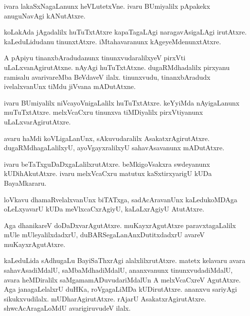 \documentclass{article}
\begin{document}
\begin{mng}%
ivara lakaSxNagaLanunx heVLutetxVne. ivaru BUmiyalilx pApakekx anuguNavAgi kANutAtxre.
\end{mng}

\begin{mng}%
koLakAda jAgadalilx huTuTxtAtxre kapaTagaLAgi naragavAsigaLAgi irutAtxre. kaLeduLidudanu 
tinunxtAtxre. iMtahavaranunx kAgeyeMdenunxtAtxre.
\end{mng}

\begin{mng}%
A pApiyu tinanxbAradudanunx tinunxvudaralilxyeV pirxVti uLaLxvanAgirutAtxne. nAyAgi huTuTxtAtxne. 
dugaRMdhadalilx pirxyanu ramisalu avarivareMba BeVdaveV ilalx. tinunxvudu, tinanxbAradudx 
ivelalxvanUnx tiMdu jiVvana mADutAtxne.
\end{mng}

\begin{mng}%
ivaru BUmiyalilx niVcayoVnigaLalilx huTuTxtAtxre. keYyiMda nAyigaLanunx muTuTxtAtxre. melxVcaCxru 
tinunxva tiMDiyalilx pirxVtiyanunx uLaLxvarAgirutAtxre.
\end{mng}

\begin{mng}%
avaru haMdi koVLigaLanUnx, sAkuvudaralilx AsakatxrAgirutAtxre. dugaRMdhagaLalilxyU, 
ayoVgayxralilxyU sahavAsavanunx mADutAtxre.
\end{mng}

\begin{mng}%
ivaru beTaTxguDaDxgaLalilxrutAtxre. beMkigoVsakxra swdeyanunx kUDihAkutAtxre. ivaru melxVcaCxru 
matutux kaSxtirxyarigU kUDa BayaMkararu.
\end{mng}

\begin{mng}%
loVkavu dhamaRvelalxvanUnx biTATxga, sadAcAravanUnx kaLedukoMDAga oLeLxyavarU kUDa 
meVlxcaCxrAgiyU, kaLaLxrAgiyU AtutAtxre.
\end{mng}

\begin{mng}%
Aga dhanikareV doDaDxvarAgutAtxre. muKayxrAgutAtxre paravxtagaLalilx mUle mUleyalilxdadxrU, 
duBARSegaLanAnxDutitxdadxrU avareV muKayxrAgutAtxre.
\end{mng}

\begin{mng}%
kaLeduLida sAdhugaLu BayiSaThxrAgi alalxlilxrutAtxre. matetx kelavaru avara sahavAsadiMdalU, 
saMbaMdhadiMdalU, ananxvanunx tinunxvudadiMdalU, avara heMDiralilx saMgamamADuvudariMdalUn A 
melxVcaCxreV AgutAtxre. Aga janagaLelalxrU duHKa, roVgagaLiMDa kUDirutAtxre. ananxvu sariyAgi 
sikukxvudilalx. mUDharAgirutAtxre. rAjarU AsakatxrAgirutAtxre. shwcAcAragaLoMdU avarigiruvudeV 
ilalx.
\end{mng}
\end{document}
